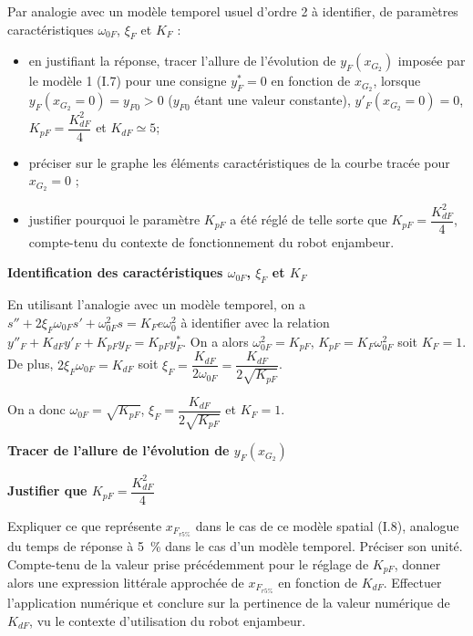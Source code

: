 \documentclass[11pt]{article}
\begin{document}
\UPSTIquestion Par analogie avec un modèle temporel usuel d’ordre 2 à identifier, de paramètres caractéristiques $\omega_{0F}$, $\xi_F$ et $K_F$ :
\begin{itemize}
\item en justifiant la réponse, tracer l’allure de l’évolution de  $y_F\left(x_{G_2}\right)$  imposée par le modèle 1 (I.7) pour une consigne $y_F^*=0$ en fonction de $x_{G_2}$, lorsque $y_F\left(x_{G_2}=0\right)=y_{F0}>0$
 ($y_{F0}$ étant une valeur constante), $y'_F\left(x_{G_2}=0\right)=0$, $K_{pF}=\dfrac{K^2_{dF}}{4}$ et $K_{dF}\simeq 5$; 
 \item préciser sur le graphe les éléments caractéristiques de la courbe tracée pour $x_{G_2}=0$ ;
\item justifier pourquoi le paramètre $K_{pF}$ a été réglé de telle sorte que $K_{pF}=\dfrac{K^2_{dF}}{4}$, compte-tenu du contexte de fonctionnement du robot enjambeur.
\end{itemize}

\begin{UPSTIcorrige}

\textbf{Identification des  caractéristiques $\omega_{0F}$, $\xi_F$ et $K_F$}

En utilisant l'analogie avec un modèle temporel, on a $s'' + 2\xi_F\omega_{0F} s' + \omega_{0F}^2 s = K_Fe\omega_0^2$ à identifier avec la relation $y''_F+K_{dF}y'_F+K_{pF}y_F=K_{pF}y^*_F$.
On a alors  $\omega_{0F}^2 =K_{pF}$, $K_{pF} = K_F\omega_{0F}^2$ soit $K_F=1$. De plus, $2\xi_F\omega_{0F} = K_{dF}$ soit $\xi_F = \dfrac{K_{dF}}{2\omega_{0F}}= \dfrac{K_{dF}}{2\sqrt{K_{pF}}}$.

On a donc $\omega_{0F}=\sqrt{K_{pF}}$, $\xi_F=\dfrac{K_{dF}}{2\sqrt{K_{pF}}}$ et $K_F=1$.


\textbf{Tracer de l’allure de l’évolution de  $y_F\left(x_{G_2}\right)$}


\textbf{Justifier que $K_{pF}=\dfrac{K^2_{dF}}{4}$}

\end{UPSTIcorrige}


\UPSTIquestion Expliquer ce que représente $x_{F_{r5\%}}$ dans le cas de ce modèle spatial (I.8), analogue du temps de réponse à \SI{5}{\%} dans le cas d’un modèle temporel. Préciser son unité. Compte-tenu de la valeur prise précédemment pour le réglage de $K_{pF}$, donner alors une expression littérale approchée de  $x_{F_{r5\%}}$ en fonction de $K_{dF}$. Effectuer
l’application numérique et conclure sur la pertinence de la valeur numérique de $K_{dF}$, vu le contexte d’utilisation
du robot enjambeur.
\end{document}
